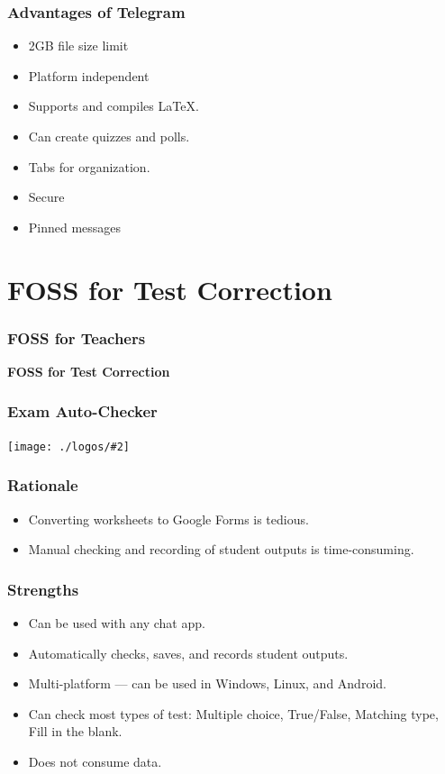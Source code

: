 \documentclass[17pt]{beamer}
\newcommand{\frontpic}[2]{\begin{frame}
		\frametitle{#1}
		\texttt{[image: ./logos/\#2]}
	\end{frame}
}
\begin{document}
	\begin{frame}
		\frametitle{Advantages of Telegram}
		\begin{multicols}{2}
		\begin{itemize}
			\item<1-> 2GB file size limit
			\item<2-> Platform independent 
			\item<3-> Supports and compiles LaTeX.
			\item<4-> Can create quizzes and polls.
			\item<5-> Tabs for organization.
			\item<6-> Secure
			\item<6-> Pinned messages
		\end{itemize}		
	\end{multicols}
	\end{frame}

    \section{FOSS for Test Correction}
    \begin{frame}
    	\frametitle{FOSS for Teachers}
    	\begin{center}
    		\textbf{\LARGE FOSS for Test Correction}
    	\end{center} 
    \end{frame}
	
	\frontpic{Exam Auto-Checker}{autochecker}
	
	\begin{frame}
		\frametitle{Rationale}
		\begin{itemize}
			\item<1-> 
			Converting worksheets to Google Forms is tedious.
			\item<2-> 
			Manual checking and recording of student outputs is time-consuming.
		\end{itemize}		
	\end{frame}

    \begin{frame}
    	\frametitle{Strengths}
    	\begin{itemize}
    		\item<1-> 
    		Can be used with any chat app.
    		\item<2-> 
    		Automatically checks, saves, and records student outputs.
    		\item<3-> 
    		Multi-platform --- can be used in Windows, Linux, and Android.
    		\item<4-> 
    		Can check most types of test: Multiple choice, True/False, Matching type, Fill in the blank.
    		\item<5-> 
    		Does not consume data.
    	\end{itemize}		
    \end{frame}
\end{document}
